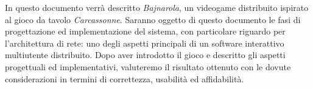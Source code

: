In questo documento verrà descritto \emph{Bajnarola}, un videogame distribuito ispirato al gioco da tavolo \emph{Carcassonne}.
Saranno oggetto di questo documento le fasi di progettazione ed implementazione del sistema, con particolare riguardo per l'architettura di rete:
uno degli aspetti principali di un software interattivo multiutente distribuito.
Dopo aver introdotto il gioco e descritto gli aspetti progettuali ed implementativi, 
valuteremo il risultato ottenuto con le dovute considerazioni in termini di correttezza, usabilità ed affidabilità.
